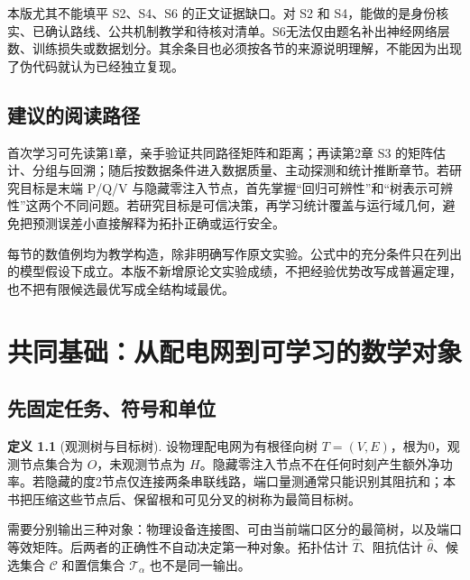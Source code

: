 \documentclass[UTF8,11pt,fontset=fandol,openany,oneside]{ctexbook}
\theoremstyle{definition}
\newtheorem{definition}[theorem]{定义}
\theoremstyle{remark}
\numberwithin{equation}{chapter}
\begin{document}
本版尤其不能填平 S2、S4、S6 的正文证据缺口。对 S2 和 S4，能做的是身份核实、已确认路线、公共机制教学和待核对清单。S6无法仅由题名补出神经网络层数、训练损失或数据划分。其余条目也必须按各节的来源说明理解，不能因为出现了伪代码就认为已经独立复现。

\section*{建议的阅读路径}
首次学习可先读第1章，亲手验证共同路径矩阵和距离；再读第2章 S3 的矩阵估计、分组与回溯；随后按数据条件进入数据质量、主动探测和统计推断章节。若研究目标是末端 P/Q/V 与隐藏零注入节点，首先掌握“回归可辨性”和“树表示可辨性”这两个不同问题。若研究目标是可信决策，再学习统计覆盖与运行域几何，避免把预测误差小直接解释为拓扑正确或运行安全。

每节的数值例均为教学构造，除非明确写作原文实验。公式中的充分条件只在列出的模型假设下成立。本版不新增原论文实验成绩，不把经验优势改写成普遍定理，也不把有限候选最优写成全结构域最优。


\tableofcontents
\mainmatter

\chapter{共同基础：从配电网到可学习的数学对象}
\label{ch:foundations}
\section{先固定任务、符号和单位}
\begin{definition}[观测树与目标树]
设物理配电网为有根径向树 $T=(V,E)$，根为0，观测节点集合为 $O$，未观测节点为 $H$。隐藏零注入节点不在任何时刻产生额外净功率。若隐藏的度2节点仅连接两条串联线路，端口量测通常只能识别其阻抗和；本书把压缩这些节点后、保留根和可见分叉的树称为最简目标树。
\end{definition}
需要分别输出三种对象：物理设备连接图、可由当前端口区分的最简树，以及端口等效矩阵。后两者的正确性不自动决定第一种对象。拓扑估计 $\widehat T$、阻抗估计 $\widehat\theta$、候选集合 $\mathcal C$ 和置信集合 $\mathcal T_\alpha$ 也不是同一输出。
\end{document}
